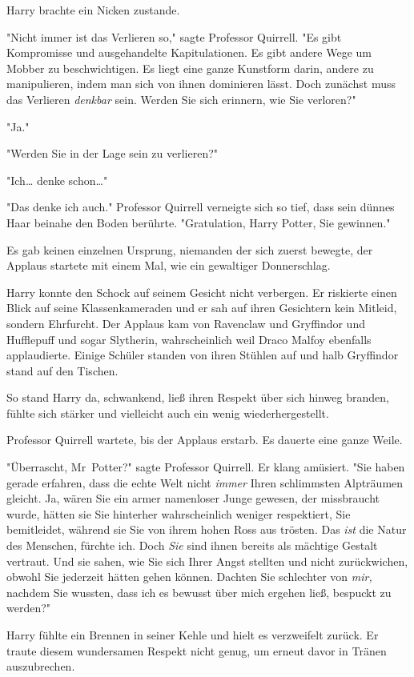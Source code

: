 {Harry brachte ein Nicken zustande.

"Nicht immer ist das Verlieren so," sagte Professor Quirrell. "Es gibt Kompromisse und ausgehandelte Kapitulationen. Es gibt andere Wege um Mobber zu beschwichtigen. Es liegt eine ganze Kunstform darin, andere zu manipulieren, indem man sich von ihnen dominieren lässt. Doch zunächst muss das Verlieren \emph{denkbar} sein. Werden Sie sich erinnern, wie Sie verloren?"

"Ja."

"Werden Sie in der Lage sein zu verlieren?"

"Ich… denke schon…"

"Das denke ich auch." Professor Quirrell verneigte sich so tief, dass sein dünnes Haar beinahe den Boden berührte. "Gratulation, Harry Potter, Sie gewinnen."

Es gab keinen einzelnen Ursprung, niemanden der sich zuerst bewegte, der Applaus startete mit einem Mal, wie ein gewaltiger Donnerschlag.

Harry konnte den Schock auf seinem Gesicht nicht verbergen. Er riskierte einen Blick auf seine Klassenkameraden und er sah auf ihren Gesichtern kein Mitleid, sondern Ehrfurcht. Der Applaus kam von Ravenclaw und Gryffindor und Hufflepuff und sogar Slytherin, wahrscheinlich weil Draco Malfoy ebenfalls applaudierte. Einige Schüler standen von ihren Stühlen auf und halb Gryffindor stand auf den Tischen.

So stand Harry da, schwankend, ließ ihren Respekt über sich hinweg branden, fühlte sich stärker und vielleicht auch ein wenig wiederhergestellt.

Professor Quirrell wartete, bis der Applaus erstarb. Es dauerte eine ganze Weile.

"Überrascht, Mr~Potter?" sagte Professor Quirrell. Er klang amüsiert. "Sie haben gerade erfahren, dass die echte Welt nicht \emph{immer} Ihren schlimmsten Alpträumen gleicht. Ja, wären Sie ein armer namenloser Junge gewesen, der missbraucht wurde, hätten sie Sie hinterher wahrscheinlich weniger respektiert, Sie bemitleidet, während sie Sie von ihrem hohen Ross aus trösten. Das \emph{ist} die Natur des Menschen, fürchte ich. Doch \emph{Sie} sind ihnen bereits als mächtige Gestalt vertraut. Und sie sahen, wie Sie sich Ihrer Angst stellten und nicht zurückwichen, obwohl Sie jederzeit hätten gehen können. Dachten Sie schlechter von \emph{mir,} nachdem Sie wussten, dass ich es bewusst über mich ergehen ließ, bespuckt zu werden?"

Harry fühlte ein Brennen in seiner Kehle und hielt es verzweifelt zurück. Er traute diesem wundersamen Respekt nicht genug, um erneut davor in Tränen auszubrechen.

}
